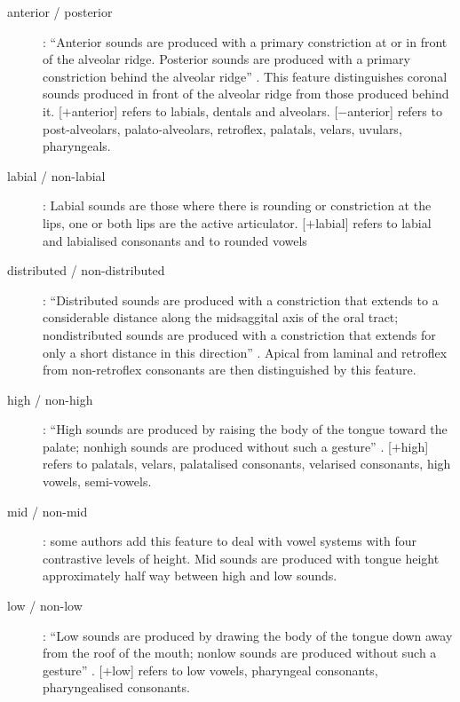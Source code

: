 \begin{description}
\item[anterior / posterior] : ``Anterior sounds are produced with a primary constriction at or in front of the alveolar ridge. Posterior sounds are produced with a primary constriction behind the alveolar ridge'' \citep{chomsky1968a}. This feature distinguishes coronal sounds produced in front of the alveolar ridge from those produced behind it. [$+$anterior] refers to labials, dentals and alveolars. [$-$anterior] refers to post-alveolars, palato-alveolars, retroflex, palatals, velars, uvulars, pharyngeals.

\item[labial / non-labial] : Labial sounds are those where there is rounding or constriction at the lips,  one or both lips are the active articulator. [$+$labial] refers to labial and labialised consonants and to rounded vowels

\item[distributed / non-distributed] : ``Distributed sounds are produced with a constriction that extends to a considerable distance along the midsaggital axis of the oral tract; nondistributed sounds are produced with a constriction that extends for only a short distance in this direction'' \citep{chomsky1968a}. Apical from laminal and retroflex from non-retroflex consonants are then distinguished by this feature.

\item[high / non-high] : ``High sounds are produced by raising the body of the tongue toward the palate; nonhigh sounds are produced without such a gesture'' \citep{chomsky1968a}. [$+$high] refers to palatals, velars, palatalised consonants, velarised consonants, high vowels, semi-vowels.

\item[mid / non-mid] : some authors add this feature to deal with vowel systems with four contrastive levels of height. Mid sounds are produced with tongue height approximately half way between high and low sounds.

\item[low / non-low] : ``Low sounds are produced by drawing the body of the tongue down away from the roof of the mouth; nonlow sounds are produced without such a gesture'' \citep{chomsky1968a}. [$+$low] refers to low vowels, pharyngeal consonants, pharyngealised consonants.


\end{description}
